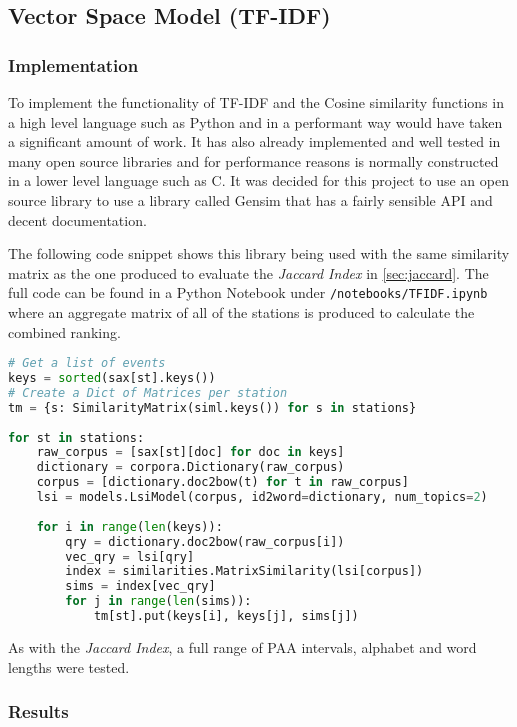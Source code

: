 \documentclass[../report.tex]{subfiles}
\begin{document}
\subsection{Vector Space Model (TF-IDF)} \label{sec:vsm-impl}
\subsubsection{Implementation}

	To implement the functionality of TF-IDF and the Cosine similarity functions in a high level language such as Python and in a performant way would have taken a significant amount of work.  It has also already implemented and well tested in many open source libraries and for performance reasons is normally constructed in a lower level language such as C.  It was decided for this project to use an open source library to use a library called Gensim \citep{rehurek_lrec} that has a fairly sensible API and decent documentation.
	
	The following code snippet shows this library being used with the same similarity matrix as the one produced to evaluate the \textit{Jaccard Index} in \cref{sec:jaccard}.  The full code can be found in a Python Notebook under \texttt{/notebooks/TFIDF.ipynb} where an aggregate matrix of all of the stations is produced to calculate the combined ranking.  
	
\begin{lstlisting}[language=Python]
# Get a list of events
keys = sorted(sax[st].keys())
# Create a Dict of Matrices per station
tm = {s: SimilarityMatrix(siml.keys()) for s in stations}
	
for st in stations:
	raw_corpus = [sax[st][doc] for doc in keys]
	dictionary = corpora.Dictionary(raw_corpus)
	corpus = [dictionary.doc2bow(t) for t in raw_corpus]
	lsi = models.LsiModel(corpus, id2word=dictionary, num_topics=2)
	
	for i in range(len(keys)):
		qry = dictionary.doc2bow(raw_corpus[i])
		vec_qry = lsi[qry]
		index = similarities.MatrixSimilarity(lsi[corpus])
		sims = index[vec_qry]
		for j in range(len(sims)):
			tm[st].put(keys[i], keys[j], sims[j])
\end{lstlisting}
	
	As with the \textit{Jaccard Index}, a full range of PAA intervals, alphabet and word lengths were tested.

	
\subsubsection{Results}
\end{document}
